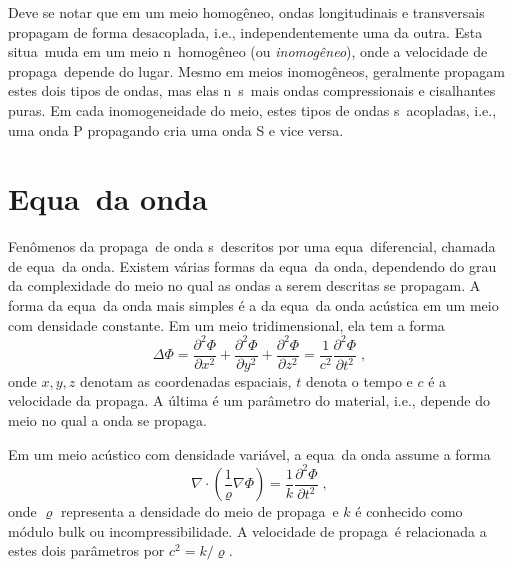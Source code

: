 Deve se notar que em um meio homog\^eneo, ondas longitudinais e
transversais propagam de forma desacoplada, i.e., independentemente uma
da outra. Esta situa\cao\ muda em um meio n\ao\ homog\^eneo (ou {\it
inomog\^eneo}), onde a velocidade de propaga\cao\ depende do lugar.
Mesmo em meios inomog\^eneos, geralmente propagam estes dois tipos de
ondas, mas elas n\ao\ s\ao\ mais ondas compressionais e cisalhantes
puras. Em cada inomogeneidade do meio, estes tipos de ondas s\ao\
acopladas, i.e., uma onda P propagando cria uma onda S e vice versa.

\section{Equa\cao\ da onda}

Fen\^omenos da propaga\cao\ de onda s\ao\ descritos por uma equa\cao\
diferencial, chamada de equa\cao\ da onda. Existem v\'arias formas da
equa\cao\ da onda, dependendo do grau da complexidade do meio no qual as
ondas a serem descritas se propagam. A forma da equa\cao\ da onda mais
simples \'e a da equa\cao\ da onda ac\'ustica em um meio com densidade
constante. Em um meio tridimensional, ela tem a forma
\begin{equation}
\Delta \Phi = 
\frac{\partial^2 \Phi}{\partial x^2} +
\frac{\partial^2 \Phi}{\partial y^2} +
\frac{\partial^2 \Phi}{\partial z^2}
= \frac{1}{c^2}
\frac{\partial^2 \Phi}{\partial t^2} \; ,
\label{eoadc}
\end{equation}
onde $x,y,z$ denotam as coordenadas espaciais, $t$ denota o tempo e $c$
\'e a velocidade da propaga\cao. A \'ultima \'e um par\^ametro do
material, i.e., depende do meio no qual a onda se propaga.

Em um meio ac\'ustico com densidade vari\'avel, a equa\cao\ da onda
assume a forma
\begin{equation}
\nabla\cdot \left(\frac{1}{\varrho} \nabla \Phi \right)
= \frac{1}{k}
\frac{\partial^2 \Phi}{\partial t^2} \; ,
\label{eoadv}
\end{equation}
onde $\varrho$ representa a densidade do meio de propaga\cao\ e $k$ \'e
conhecido como m\'odulo bulk ou incompressibilidade. A velocidade de
propaga\cao\ \'e relacionada a estes dois par\^ametros por
$c^2=k/\varrho$.

